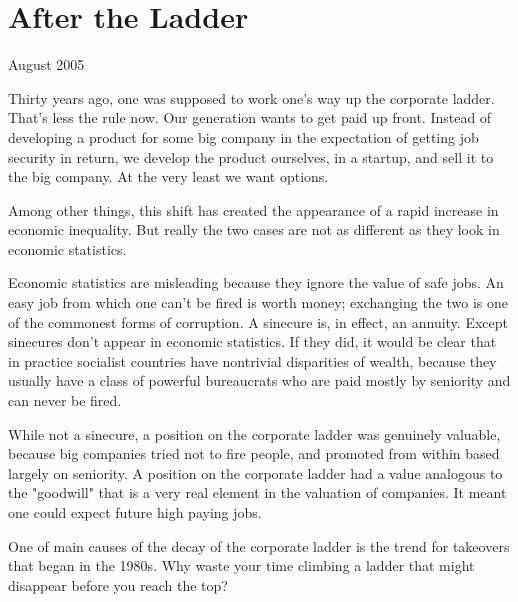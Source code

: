 \chapter{After the Ladder}


            
              
                

August 2005

Thirty years ago, one was supposed to
                  work one's way up the corporate ladder. That's less the rule
                  now. Our generation wants to get paid up front. Instead of
                  developing a product for some big company in the expectation
                  of getting job security in return, we develop the product
                  ourselves, in a startup, and sell it to the big company. At
                  the very least we want options.

Among other things,
                  this shift has created the appearance of a rapid increase in
                  economic inequality. But really the two cases are not as
                  different as they look in economic statistics.

Economic
                  statistics are misleading because they ignore the value of
                  safe jobs. An easy job from which one can't be fired is worth
                  money; exchanging the two is one of the commonest forms of
                  corruption. A sinecure is, in effect, an annuity. Except
                  sinecures don't appear in economic statistics. If they did, it
                  would be clear that in practice socialist countries have
                  nontrivial disparities of wealth, because they usually have a
                  class of powerful bureaucrats who are paid mostly by seniority
                  and can never be fired.

While not a sinecure, a
                  position on the corporate ladder was genuinely valuable,
                  because big companies tried not to fire people, and promoted
                  from within based largely on seniority. A position on the
                  corporate ladder had a value analogous to the "goodwill" that
                  is a very real element in the valuation of companies. It meant
                  one could expect future high paying jobs.

One of
                  main causes of the decay of the corporate ladder is the trend
                  for takeovers that began in the 1980s. Why waste your time
                  climbing a ladder that might disappear before you reach the
                  top?

